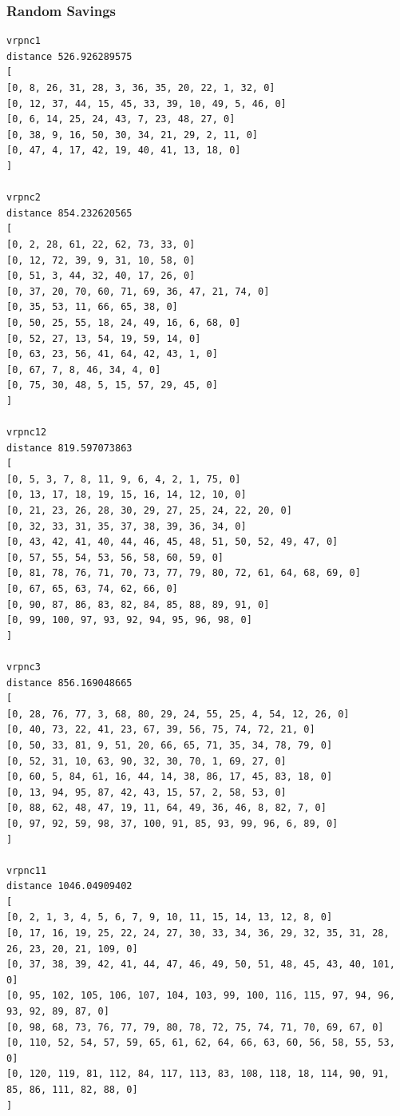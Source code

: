 \documentclass{article} %
\begin{document}
\subsubsection{Random Savings}
\begin{lstlisting}[breaklines, basicstyle=\tiny]
vrpnc1
distance 526.926289575
[
[0, 8, 26, 31, 28, 3, 36, 35, 20, 22, 1, 32, 0]
[0, 12, 37, 44, 15, 45, 33, 39, 10, 49, 5, 46, 0]
[0, 6, 14, 25, 24, 43, 7, 23, 48, 27, 0]
[0, 38, 9, 16, 50, 30, 34, 21, 29, 2, 11, 0]
[0, 47, 4, 17, 42, 19, 40, 41, 13, 18, 0]
]

vrpnc2
distance 854.232620565
[
[0, 2, 28, 61, 22, 62, 73, 33, 0]
[0, 12, 72, 39, 9, 31, 10, 58, 0]
[0, 51, 3, 44, 32, 40, 17, 26, 0]
[0, 37, 20, 70, 60, 71, 69, 36, 47, 21, 74, 0]
[0, 35, 53, 11, 66, 65, 38, 0]
[0, 50, 25, 55, 18, 24, 49, 16, 6, 68, 0]
[0, 52, 27, 13, 54, 19, 59, 14, 0]
[0, 63, 23, 56, 41, 64, 42, 43, 1, 0]
[0, 67, 7, 8, 46, 34, 4, 0]
[0, 75, 30, 48, 5, 15, 57, 29, 45, 0]
]

vrpnc12
distance 819.597073863
[
[0, 5, 3, 7, 8, 11, 9, 6, 4, 2, 1, 75, 0]
[0, 13, 17, 18, 19, 15, 16, 14, 12, 10, 0]
[0, 21, 23, 26, 28, 30, 29, 27, 25, 24, 22, 20, 0]
[0, 32, 33, 31, 35, 37, 38, 39, 36, 34, 0]
[0, 43, 42, 41, 40, 44, 46, 45, 48, 51, 50, 52, 49, 47, 0]
[0, 57, 55, 54, 53, 56, 58, 60, 59, 0]
[0, 81, 78, 76, 71, 70, 73, 77, 79, 80, 72, 61, 64, 68, 69, 0]
[0, 67, 65, 63, 74, 62, 66, 0]
[0, 90, 87, 86, 83, 82, 84, 85, 88, 89, 91, 0]
[0, 99, 100, 97, 93, 92, 94, 95, 96, 98, 0]
]

vrpnc3
distance 856.169048665
[
[0, 28, 76, 77, 3, 68, 80, 29, 24, 55, 25, 4, 54, 12, 26, 0]
[0, 40, 73, 22, 41, 23, 67, 39, 56, 75, 74, 72, 21, 0]
[0, 50, 33, 81, 9, 51, 20, 66, 65, 71, 35, 34, 78, 79, 0]
[0, 52, 31, 10, 63, 90, 32, 30, 70, 1, 69, 27, 0]
[0, 60, 5, 84, 61, 16, 44, 14, 38, 86, 17, 45, 83, 18, 0]
[0, 13, 94, 95, 87, 42, 43, 15, 57, 2, 58, 53, 0]
[0, 88, 62, 48, 47, 19, 11, 64, 49, 36, 46, 8, 82, 7, 0]
[0, 97, 92, 59, 98, 37, 100, 91, 85, 93, 99, 96, 6, 89, 0]
]

vrpnc11
distance 1046.04909402
[
[0, 2, 1, 3, 4, 5, 6, 7, 9, 10, 11, 15, 14, 13, 12, 8, 0]
[0, 17, 16, 19, 25, 22, 24, 27, 30, 33, 34, 36, 29, 32, 35, 31, 28, 26, 23, 20, 21, 109, 0]
[0, 37, 38, 39, 42, 41, 44, 47, 46, 49, 50, 51, 48, 45, 43, 40, 101, 0]
[0, 95, 102, 105, 106, 107, 104, 103, 99, 100, 116, 115, 97, 94, 96, 93, 92, 89, 87, 0]
[0, 98, 68, 73, 76, 77, 79, 80, 78, 72, 75, 74, 71, 70, 69, 67, 0]
[0, 110, 52, 54, 57, 59, 65, 61, 62, 64, 66, 63, 60, 56, 58, 55, 53, 0]
[0, 120, 119, 81, 112, 84, 117, 113, 83, 108, 118, 18, 114, 90, 91, 85, 86, 111, 82, 88, 0]
]


\end{lstlisting}
\end{document}
